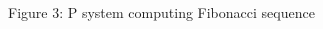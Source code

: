 \documentclass[myposter,portrait]{sciposter}
\begin{document}
\begin{multicols*}{3}
\begin{tikzpicture}
\end{tikzpicture}

\begin{center}%
  Figure 3: P system computing Fibonacci sequence
\end{center}%

\vspace{10mm}





\end{multicols*}
\end{document}
